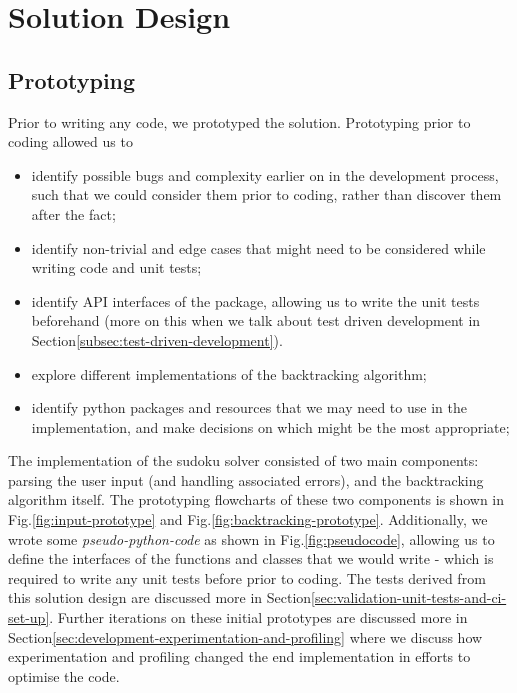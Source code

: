 
\section{Solution Design}\label{sec:solution-design}
    \subsection{Prototyping}\label{subsec:prototyping}
    Prior to writing any code, we prototyped the solution.
    Prototyping prior to coding allowed us to
    \begin{itemize}
        \item identify possible bugs and complexity earlier on in the development process, such that we could consider them
        prior to coding, rather than discover them after the fact;
        \item identify non-trivial and edge cases that might need to be considered while writing code and unit tests;
        \item identify API interfaces of the package, allowing us to write the unit tests beforehand (more on this when
        we talk about test driven development in Section\eqref{subsec:test-driven-development}).
        \item explore different implementations of the backtracking algorithm;
        \item identify python packages and resources that we may need to use in the implementation, and make decisions on which
        might be the most appropriate;
    \end{itemize}
    The implementation of the sudoku solver consisted of two main components: parsing the user input (and handling
    associated errors), and the backtracking algorithm itself.
    The prototyping flowcharts of these two components is shown in Fig.\eqref{fig:input-prototype} and Fig.\eqref{fig:backtracking-prototype}.
    Additionally, we wrote some \textit{pseudo-python-code} as shown in Fig.\eqref{fig:pseudocode}, allowing us to define
    the interfaces of the functions and classes that we would write - which is required to write any unit tests before prior
    to coding.
    The tests derived from this solution design are discussed more in Section\eqref{sec:validation-unit-tests-and-ci-set-up}.
    Further iterations on these initial prototypes are discussed more in Section\eqref{sec:development-experimentation-and-profiling}
    where we discuss how experimentation and profiling changed the end implementation in efforts to optimise the code.

